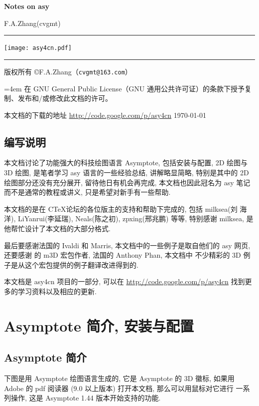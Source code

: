\documentclass[nofonts,CJKnormalspaces]{ctexbook}[2009/05/20]
\newcommand*\prgname[1]{\textsf{#1}}
\begin{document}
\frontmatter

\begin{titlepage}
  \setlength{\parindent}{0pt}

  \centerline{\Huge\bfseries\prgname{Notes on asy}}
  \hfill F.A.Zhang(cvgmt)
  \rule[0pt]{\textwidth}{4pt}

  \centerline{\texttt{[image: asy4cn.pdf]}}

  \rule[0pt]{\textwidth}{2pt}

  版权所有 \copyright{}F.A.Zhang（\nolinkurl{cvgmt@163.com}）

  {\leftskip=4em
    在 GNU General Public License（GNU 通用公共许可证）的条款下授予复制、发布和/或修改此文档的许可。\par}
  本文档的下载的地址 \url{http://code.google.com/p/asy4cn}
  \qquad\today
\end{titlepage}

\section*{编写说明}
本文档讨论了功能强大的科技绘图语言 Asymptote, 包括安装与配置, 2D 绘图与
3D 绘图, 是笔者学习 asy 语言的一些经验总结, 讲解略显简略, 特别是其中的
2D 绘图部分还没有充分展开, 留待他日有机会再完成, 本文档也因此冠名为 asy
笔记而不是通常的教程或讲义, 只是希望对新手有一些帮助.

本文档的是在 C\TeX 论坛的各位版主的支持和帮助下完成的, 包括 milksea(刘
海洋), LiYanrui(李延瑞), Neals(陈之初), zpxing(邢兆鹏) 等等, 特别感谢
milksea, 是他帮忙设计了本文档的大部分格式.

最后要感谢法国的 Ivaldi 和 Marris, 本文档中的一些例子是取自他们的 asy
网页, 还要感谢 \MP{} 的 m3D 宏包作者, 法国的 Anthony Phan, 本文档中
不少精彩的 3D 例子是从这个宏包提供的例子翻译改进得到的.

本文档是 asy4cn 项目的一部分, 可以在
\url{http://code.google.com/p/asy4cn} 找到更多的学习资料以及相应的更新.

\tableofcontents

\mainmatter

\chapter{Asymptote 简介, 安装与配置}
\section{Asymptote 简介}
下图是用 Asymptote 绘图语言生成的, 它是 Asymptote 的 3D 徽标, 如果用
Adobe 的 pdf 阅读器 (9.0 以上版本) 打开本文档, 那么可以用鼠标对它进行
一系列操作, 这是 Asymptote 1.44 版本开始支持的功能.
\end{document}
